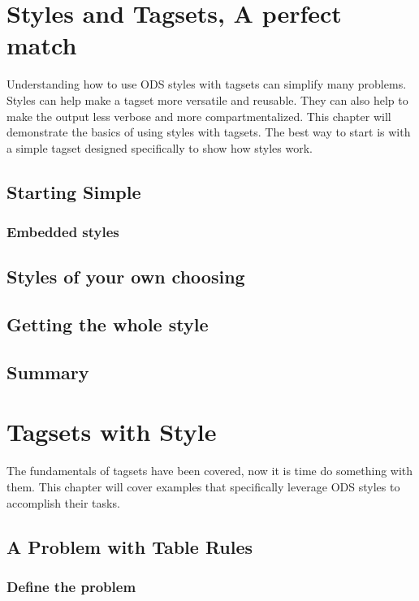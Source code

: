 \documentclass{book}
\begin{document}
\chapter{Styles and Tagsets, A perfect match}
Understanding how to use ODS styles with tagsets can
simplify many problems.  Styles can help make
a tagset more versatile and reusable.  They can
also help to make the output less verbose and
more compartmentalized. This chapter 
will demonstrate the basics of using styles 
with tagsets.   The best way to start is with
a simple tagset designed specifically
to show how styles work.  
\section{Starting Simple}

\subsection{Embedded styles}

\section{Styles of your own choosing}       

\section{Getting the whole style}       

\section{Summary}

\chapter{Tagsets with Style}
The fundamentals of tagsets have been covered, now it is time
do something with them. 
This chapter will cover examples that specifically leverage
ODS styles to accomplish their tasks.
\section{A Problem with Table Rules}

\subsection{Define the problem}
\end{document}
